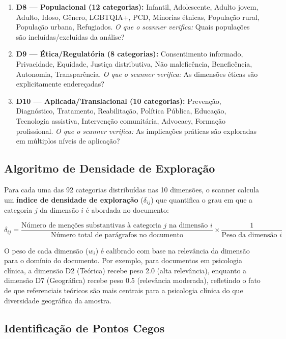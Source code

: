 \begin{enumerate}
  \item \textbf{D8 — Populacional (12 categorias):} Infantil, Adolescente, Adulto jovem, Adulto, Idoso, Gênero, LGBTQIA+, PCD, Minorias étnicas, População rural, População urbana, Refugiados. \textit{O que o scanner verifica:} Quais populações são incluídas/excluídas da análise?

  \item \textbf{D9 — Ética/Regulatória (8 categorias):} Consentimento informado, Privacidade, Equidade, Justiça distributiva, Não maleficência, Beneficência, Autonomia, Transparência. \textit{O que o scanner verifica:} As dimensões éticas são explicitamente endereçadas?

  \item \textbf{D10 — Aplicada/Translacional (10 categorias):} Prevenção, Diagnóstico, Tratamento, Reabilitação, Política Pública, Educação, Tecnologia assistiva, Intervenção comunitária, Advocacy, Formação profissional. \textit{O que o scanner verifica:} As implicações práticas são exploradas em múltiplos níveis de aplicação?
\end{enumerate}

\subsection{Algoritmo de Densidade de Exploração}

Para cada uma das 92 categorias distribuídas nas 10 dimensões, o scanner calcula um \textbf{índice de densidade de exploração} ($\delta_{ij}$) que quantifica o grau em que a categoria $j$ da dimensão $i$ é abordada no documento:

\[
\delta_{ij} = \frac{\text{Número de menções substantivas à categoria } j \text{ na dimensão } i}{\text{Número total de parágrafos no documento}} \times \frac{1}{\text{Peso da dimensão } i}
\]

O peso de cada dimensão ($w_i$) é calibrado com base na relevância da dimensão para o domínio do documento. Por exemplo, para documentos em psicologia clínica, a dimensão D2 (Teórica) recebe peso 2.0 (alta relevância), enquanto a dimensão D7 (Geográfica) recebe peso 0.5 (relevância moderada), refletindo o fato de que referenciais teóricos são mais centrais para a psicologia clínica do que diversidade geográfica da amostra.

\subsection{Identificação de Pontos Cegos}

